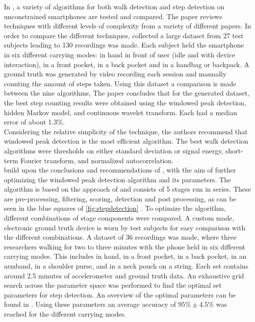 In \cite{Brajdic2013}, a variety of algorithms for both walk detection and step detection on unconstrained smartphones are tested and compared. The paper reviews techniques with different levels of complexity from a variety of different papers. In order to compare the different techniques, \citet{Brajdic2013} collected a large dataset from 27 test subjects leading to 130 recordings was made. Each subject held the smartphone in six different carrying modes: in 
hand in front of user (idle and with device interaction), in a front pocket, in a back pocket and in a handbag or backpack. A ground truth was generated by video recording each session and manually counting the amount of steps taken. Using this dataset a comparison is made between the nine algorithms, 
\newline
The paper concludes that for the generated dataset, the best step counting results were obtained using the windowed peak detection, hidden Markov model, and continuous wavelet transform. Each had a median error of about 1.3\%.\\
Considering the relative simplicity of the technique, the authors recommend that windowed peak detection is the most efficient algorithm. The best walk detection algorithms were thresholds on either standard deviation or signal energy,  short-term Fourier transform, and normalized autocorrelation.\\
\citet{Salvi2018} build upon the conclusions and recommendations of \citet{Brajdic2013}, with the aim of further optimizing the windowed peak detection algorithm and its parameters. The algorithm is based on the approach of \citet{Palshikar2009} and consists of 5 stages run in series. These are pre-processing, filtering, scoring, detection and post processing, as can be seen in the blue squares of \cref{fig:stepdetection} . To optimize the algorithm, different combinations of stage components were compared. A custom made, electronic ground truth device is worn by test subjects for easy comparison with the different combinations. A dataset of 36 recordings was made,  where three researchers walking for two to three minutes with the phone held in six different carrying modes. This includes in hand, in a front pocket, in a back pocket, in an armband, in a shoulder purse, and in a neck pouch on a string. Each set contains around 2.5 minutes of accelerometer and ground truth data. An exhaustive grid search across the parameter space was performed to find the optimal set parameters for step detection. An overview of the optimal parameters can be found in . Using these parameters an average accuracy of $95\% \pm 4.5\%$ was reached for the different carrying modes.



